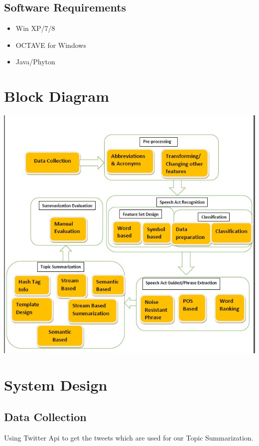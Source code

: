 \documentclass[conference]{IEEEtran}
\begin{document}
\subsection{\textbf{Software Requirements}}
\begin{itemize}
\item{Win XP/7/8}
\item{OCTAVE for Windows}
\item{Java/Phyton}
\end{itemize}

\section{\textbf{Block Diagram}}
\begin{center}
\includegraphics[scale=0.5]{module.jpg}
\end{center}

\section{\textbf{System Design}}
\subsection{\textbf{Data Collection}}
\par Using Twitter Api to get the tweets which are used for our Topic Summarization.
\end{document}
